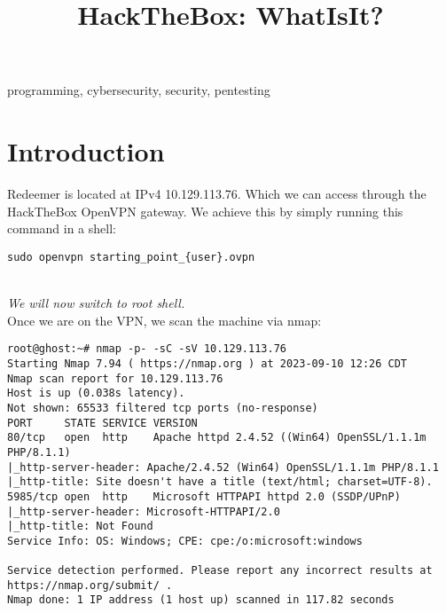 \documentclass[conference]{IEEEtran}
\begin{document}
\onecolumn


\title{HackTheBox: WhatIsIt?}

\author{
}

\maketitle



\begin{abstract}

\end{abstract}



\begin{IEEEkeywords}
programming, cybersecurity, security, pentesting
\end{IEEEkeywords}


\section{Introduction}
Redeemer is located at IPv4 10.129.113.76. Which we can access through the HackTheBox OpenVPN gateway.
We achieve this by simply running this command in a shell:
\begin{scriptsize}
\begin{verbatim}
sudo openvpn starting_point_{user}.ovpn
\end{verbatim}
\end{scriptsize}

\\
\textit{We will now switch to root shell.}
\\

Once we are on the VPN, we scan the machine via nmap:
\begin{scriptsize}
\begin{verbatim}
root@ghost:~# nmap -p- -sC -sV 10.129.113.76
Starting Nmap 7.94 ( https://nmap.org ) at 2023-09-10 12:26 CDT
Nmap scan report for 10.129.113.76
Host is up (0.038s latency).
Not shown: 65533 filtered tcp ports (no-response)
PORT     STATE SERVICE VERSION
80/tcp   open  http    Apache httpd 2.4.52 ((Win64) OpenSSL/1.1.1m PHP/8.1.1)
|_http-server-header: Apache/2.4.52 (Win64) OpenSSL/1.1.1m PHP/8.1.1
|_http-title: Site doesn't have a title (text/html; charset=UTF-8).
5985/tcp open  http    Microsoft HTTPAPI httpd 2.0 (SSDP/UPnP)
|_http-server-header: Microsoft-HTTPAPI/2.0
|_http-title: Not Found
Service Info: OS: Windows; CPE: cpe:/o:microsoft:windows

Service detection performed. Please report any incorrect results at https://nmap.org/submit/ .
Nmap done: 1 IP address (1 host up) scanned in 117.82 seconds
\end{verbatim}
\end{scriptsize}
\end{document}
